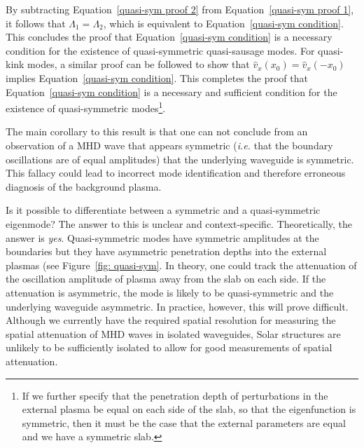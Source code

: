 \documentclass[12pt,draft]{../style-files/ociamthesis}
\begin{document}
By subtracting Equation~\eqref{quasi-sym proof 2} from Equation~\eqref{quasi-sym proof 1}, it follows that $\Lambda_1 = \Lambda_2$, which is equivalent to Equation~\eqref{quasi-sym condition}. This concludes the proof that Equation~\eqref{quasi-sym condition} is a necessary condition for the existence of quasi-symmetric quasi-sausage modes. For quasi-kink modes, a similar proof can be followed to show that $\hat{v}_x(x_0) = \hat{v}_x(-x_0)$ implies Equation~\eqref{quasi-sym condition}. This completes the proof that Equation~\eqref{quasi-sym condition} is a necessary and sufficient condition for the existence of quasi-symmetric modes\footnote{If we further specify that the penetration depth of perturbations in the external plasma be equal on each side of the slab, so that the eigenfunction is symmetric, then it must be the case that the external parameters are equal and we have a symmetric slab.}.

The main corollary to this result is that one can not conclude from an observation of a MHD wave that appears symmetric (\textit{i.e.} that the boundary oscillations are of equal amplitudes) that the underlying waveguide is symmetric. This fallacy could lead to incorrect mode identification and therefore erroneous diagnosis of the background plasma.

Is it possible to differentiate between a symmetric and a quasi-symmetric eigenmode? The answer to this is unclear and context-specific. Theoretically, the answer is \textit{yes}. Quasi-symmetric modes have symmetric amplitudes at the boundaries but they have asymmetric penetration depths into the external plasmas (see Figure~\ref{fig: quasi-sym}. In theory, one could track the attenuation of the oscillation amplitude of plasma away from the slab on each side. If the attenuation is asymmetric, the mode is likely to be quasi-symmetric and the underlying waveguide asymmetric. In practice, however, this will prove difficult. Although we currently have the required spatial resolution for measuring the spatial attenuation of MHD waves in isolated waveguides, Solar structures are unlikely to be sufficiently isolated to allow for good measurements of spatial attenuation.
\end{document}
